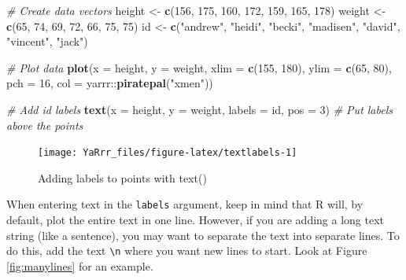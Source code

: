 \documentclass[]{book}
\newenvironment{Shaded}{\begin{snugshade}}{\end{snugshade}}
\newcommand{\KeywordTok}[1]{\textcolor[rgb]{0.13,0.29,0.53}{\textbf{{#1}}}}
\newcommand{\DataTypeTok}[1]{\textcolor[rgb]{0.13,0.29,0.53}{{#1}}}
\newcommand{\DecValTok}[1]{\textcolor[rgb]{0.00,0.00,0.81}{{#1}}}
\newcommand{\StringTok}[1]{\textcolor[rgb]{0.31,0.60,0.02}{{#1}}}
\newcommand{\CommentTok}[1]{\textcolor[rgb]{0.56,0.35,0.01}{\textit{{#1}}}}
\newcommand{\NormalTok}[1]{{#1}}
\theoremstyle{definition}
\theoremstyle{definition}
\theoremstyle{remark}
\begin{document}
\begin{Shaded}
\begin{Highlighting}[]
\CommentTok{# Create data vectors}
\NormalTok{height <-}\StringTok{ }\KeywordTok{c}\NormalTok{(}\DecValTok{156}\NormalTok{, }\DecValTok{175}\NormalTok{, }\DecValTok{160}\NormalTok{, }\DecValTok{172}\NormalTok{, }\DecValTok{159}\NormalTok{, }\DecValTok{165}\NormalTok{, }\DecValTok{178}\NormalTok{)}
\NormalTok{weight <-}\StringTok{ }\KeywordTok{c}\NormalTok{(}\DecValTok{65}\NormalTok{, }\DecValTok{74}\NormalTok{, }\DecValTok{69}\NormalTok{, }\DecValTok{72}\NormalTok{, }\DecValTok{66}\NormalTok{, }\DecValTok{75}\NormalTok{, }\DecValTok{75}\NormalTok{)}
\NormalTok{id <-}\StringTok{ }\KeywordTok{c}\NormalTok{(}\StringTok{"andrew"}\NormalTok{, }\StringTok{"heidi"}\NormalTok{, }\StringTok{"becki"}\NormalTok{, }\StringTok{"madisen"}\NormalTok{, }\StringTok{"david"}\NormalTok{, }\StringTok{"vincent"}\NormalTok{, }\StringTok{"jack"}\NormalTok{)}

\CommentTok{# Plot data}
\KeywordTok{plot}\NormalTok{(}\DataTypeTok{x =} \NormalTok{height, }
     \DataTypeTok{y =} \NormalTok{weight, }
     \DataTypeTok{xlim =} \KeywordTok{c}\NormalTok{(}\DecValTok{155}\NormalTok{, }\DecValTok{180}\NormalTok{), }
     \DataTypeTok{ylim =} \KeywordTok{c}\NormalTok{(}\DecValTok{65}\NormalTok{, }\DecValTok{80}\NormalTok{), }
     \DataTypeTok{pch =} \DecValTok{16}\NormalTok{,}
     \DataTypeTok{col =} \NormalTok{yarrr::}\KeywordTok{piratepal}\NormalTok{(}\StringTok{"xmen"}\NormalTok{))}

\CommentTok{# Add id labels}
\KeywordTok{text}\NormalTok{(}\DataTypeTok{x =} \NormalTok{height, }
     \DataTypeTok{y =} \NormalTok{weight,}
     \DataTypeTok{labels =} \NormalTok{id, }
     \DataTypeTok{pos =} \DecValTok{3}\NormalTok{)            }\CommentTok{# Put labels above the points}
\end{Highlighting}
\end{Shaded}

\begin{figure}

{\centering \texttt{[image: YaRrr\_files/figure-latex/textlabels-1]} 

}

\caption{Adding labels to points with text()}\label{fig:textlabels}
\end{figure}

When entering text in the \texttt{labels} argument, keep in mind that R
will, by default, plot the entire text in one line. However, if you are
adding a long text string (like a sentence), you may want to separate
the text into separate lines. To do this, add the text
\texttt{\textbackslash{}n} where you want new lines to start. Look at
Figure \ref{fig:manylines} for an example.
\end{document}
